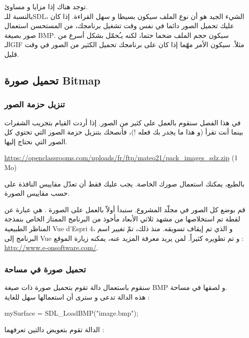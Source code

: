 توجد هناك إذا مزايا و مساوئ.\\
بالنسبة للـ\textenglish{SDL}،
الشيء الجيد هو أن نوع الملف سيكون بسيطا و سهل القراءة. إذا كان عليك تحميل الصور دائما في نفس وقت تشغيل برنامجك، من المستحسن استعمال صور بصيغة 
\textenglish{BMP}.
سيكون حجم الملف ضخما حتما، لكنه يـُحمّل بشكل أسرع من الـ\textenglish{GIF}
مثلاً. سيكون الأمر مهّما إذا كان على برنامجك تحميل الكثير من الصور في وقت قليل.

\subsection{تحميل صورة \textenglish{Bitmap}}

\subsubsection{تنزيل حزمة الصور}

في هذا الفصل سنقوم بالعمل على كثير من الصور. إذا أردت القيام بتجريب الشفرات بينما أنت تقرأ (و هذا ما يجدر بك فعله !)، فأنصحك بتنزيل حزمة الصور التي تحتوي كل الصور التي نحتاج إليها.

\textenglish{\url{https://openclassrooms.com/uploads/fr/ftp/mateo21/pack_images_sdz.zip} (1 Mo)}

بالطبع، يمكنك استعمال صورك الخاصة. يجب عليك فقط أن تعدّل مقاييس النافذة على حسب مقاييس الصورة.

قم بوضع كل الصور في مجلّد المشروع. سنبدأ أولاّ بالعمل على الصورة 
.
هي عبارة عن لقطة تم استخلاصها من مشهد ثلاثي الأبعاد مأخوذ من البرنامج الممتاز الخاص بنمذجة المناظر الطبيعية
\textenglish{Vue d'Espri 4}،
و الذي تم إيقاف تسويقه. منذ ذلك، تمّ تغيير اسم البرنامج إلى
\textenglish{Vue}
و تم تطويره كثيراً. لمن يريد معرفة المزيد عنه، يمكنه زيارة الموقع :
\url{http://www.e-onsoftware.com/}.

\subsubsection{تحميل صورة في مساحة}

سنقوم باستعمال دالة تقوم بتحميل صورة ذات صيغة
\textenglish{BMP}
و لصقها في مساحة.\\
هذه الدالة تدعى 
و سترى أن استعمالها سهل للغاية :

\begin{Csource}
mySurface = SDL_LoadBMP("image.bmp");
\end{Csource}

الدالة
تقوم بتعويض دالتين تعرفهما :

